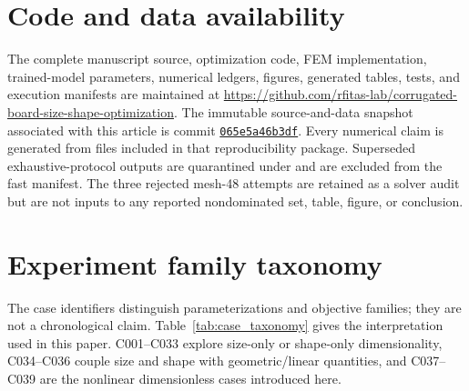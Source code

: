\documentclass[11pt]{article}
\begin{document}
\section*{Code and data availability}

The complete manuscript source, optimization code, FEM implementation, trained-model parameters, numerical ledgers, figures, generated tables, tests, and execution manifests are maintained at \url{https://github.com/rfitas-lab/corrugated-board-size-shape-optimization}. The immutable source-and-data snapshot associated with this article is commit \href{https://github.com/rfitas-lab/corrugated-board-size-shape-optimization/commit/065e5a46b3df6a8ae69e927219fd678cb5aab534}{\texttt{065e5a46b3df}}. Every numerical claim is generated from files included in that reproducibility package. Superseded exhaustive-protocol outputs are quarantined under  and are excluded from the fast manifest. The three rejected mesh-48 attempts are retained as a solver audit but are not inputs to any reported nondominated set, table, figure, or conclusion.

\appendix

\section{Experiment family taxonomy}

The case identifiers distinguish parameterizations and objective families; they are not a chronological claim. Table~\ref{tab:case_taxonomy} gives the interpretation used in this paper. C001--C033 explore size-only or shape-only dimensionality, C034--C036 couple size and shape with geometric/linear quantities, and C037--C039 are the nonlinear dimensionless cases introduced here.
\end{document}
